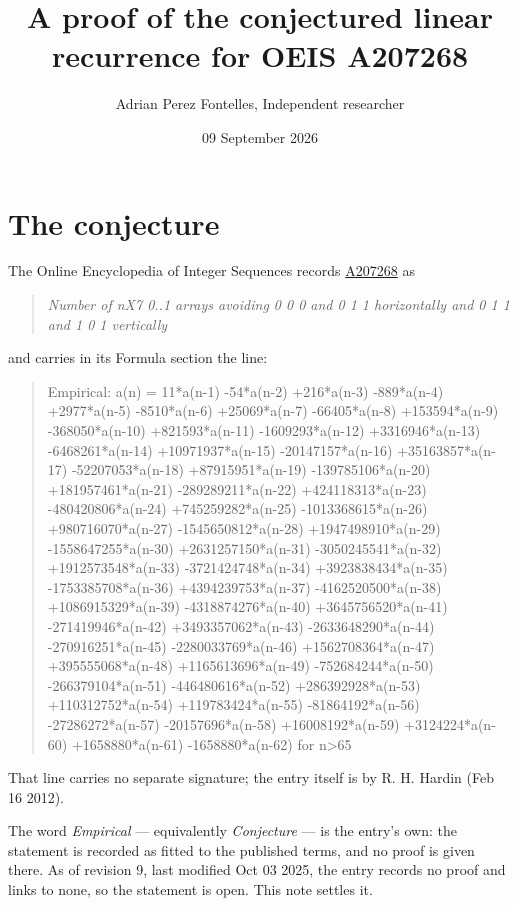 \documentclass[11pt]{article}
\title{A proof of the conjectured linear recurrence for OEIS A207268}
\author{Adrian Perez Fontelles, Independent researcher}
\date{09 September 2026}
\theoremstyle{definition}
\begin{document}
\maketitle
\section{The conjecture}

The Online Encyclopedia of Integer Sequences records \href{https://oeis.org/A207268}{A207268} as

\begin{quote}\itshape Number of nX7 0..1 arrays avoiding 0 0 0 and 0 1 1 horizontally and 0 1 1 and 1 0 1 vertically\end{quote}

and carries in its Formula section the line:

\begin{quote}\ttfamily Empirical: a(n) = 11*a(n-1) -54*a(n-2) +216*a(n-3) -889*a(n-4) +2977*a(n-5) -8510*a(n-6) +25069*a(n-7) -66405*a(n-8) +153594*a(n-9) -368050*a(n-10) +821593*a(n-11) -1609293*a(n-12) +3316946*a(n-13) -6468261*a(n-14) +10971937*a(n-15) -20147157*a(n-16) +35163857*a(n-17) -52207053*a(n-18) +87915951*a(n-19) -139785106*a(n-20) +181957461*a(n-21) -289289211*a(n-22) +424118313*a(n-23) -480420806*a(n-24) +745259282*a(n-25) -1013368615*a(n-26) +980716070*a(n-27) -1545650812*a(n-28) +1947498910*a(n-29) -1558647255*a(n-30) +2631257150*a(n-31) -3050245541*a(n-32) +1912573548*a(n-33) -3721424748*a(n-34) +3923838434*a(n-35) -1753385708*a(n-36) +4394239753*a(n-37) -4162520500*a(n-38) +1086915329*a(n-39) -4318874276*a(n-40) +3645756520*a(n-41) -271419946*a(n-42) +3493357062*a(n-43) -2633648290*a(n-44) -270916251*a(n-45) -2280033769*a(n-46) +1562708364*a(n-47) +395555068*a(n-48) +1165613696*a(n-49) -752684244*a(n-50) -266379104*a(n-51) -446480616*a(n-52) +286392928*a(n-53) +110312752*a(n-54) +119783424*a(n-55) -81864192*a(n-56) -27286272*a(n-57) -20157696*a(n-58) +16008192*a(n-59) +3124224*a(n-60) +1658880*a(n-61) -1658880*a(n-62) for n>65\end{quote}

That line carries no separate signature; the entry itself is by R. H. Hardin (Feb 16 2012).

The word {\itshape Empirical} --- equivalently {\itshape Conjecture} --- is the entry's own: the statement is recorded as fitted to the published terms, and no proof is given there. As of revision 9, last modified Oct 03 2025, the entry records no proof and links to none, so the statement is open. This note settles it.
\end{document}
